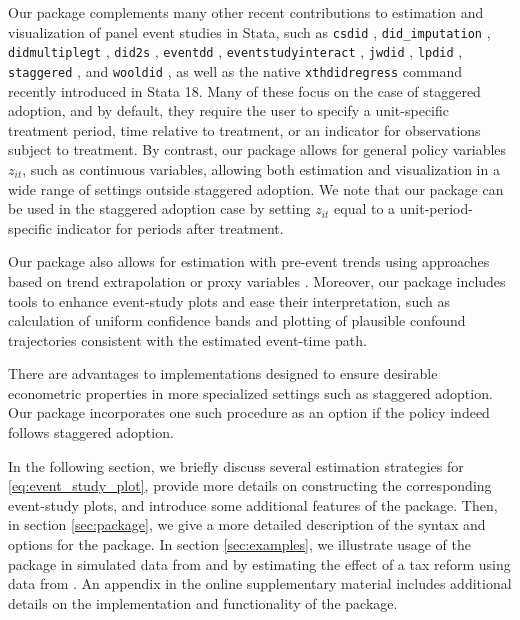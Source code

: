 \documentclass[12pt]{article}
\begin{document}
\sloppypar Our package complements many other recent contributions to estimation and visualization of panel event studies in Stata, such as \texttt{csdid} \citep{csdid}, \mbox{\texttt{did\_imputation}} \citep{didimputation}, \texttt{didmultiplegt} \citep{didmultiplegt}, \texttt{did2s} \citep{did2s}, \texttt{eventdd} \citep{eventddsj}, \mbox{\texttt{eventstudyinteract}} \citep{eventstudyinteract}, \texttt{jwdid} \citep{jwdid}, \texttt{lpdid} \citep{lpdid}, \mbox{\texttt{staggered}} \citep{staggered}, and \texttt{wooldid} \citep{wooldid}, as well as the native \mbox{\texttt{xthdidregress}} command recently introduced in Stata 18.
Many of these focus on the case of staggered adoption, and by default, they require the user to specify a unit-specific treatment period, time relative to treatment, or an indicator for observations subject to treatment.
By contrast, our package allows for general policy variables $z_{it}$, such as continuous variables, allowing both estimation and visualization in a wide range of settings outside staggered adoption.
We note that our package can be used in the staggered adoption case by setting $z_{it}$ equal to a unit-period-specific indicator for periods after treatment.

Our package also allows for estimation with pre-event trends using approaches based on trend extrapolation \citep{dobkin2018economic} or proxy variables \citep{freyaldenhoven2019pre}.
Moreover, our package includes tools to enhance event-study plots and ease their interpretation, such as calculation of uniform confidence bands and plotting of plausible confound trajectories consistent with the estimated event-time path.

There are advantages to implementations designed to ensure desirable econometric properties in more specialized settings such as staggered adoption.
Our package incorporates one such procedure as an option if the policy indeed follows staggered adoption.


In the following section, we briefly discuss several estimation strategies for \eqref{eq:event_study_plot}, provide more details on constructing the corresponding event-study plots, and introduce some additional features of the \xtevent package.
Then, in section \ref{sec:package}, we give a more detailed description of the syntax and options for the \xtevent package.
In section \ref{sec:examples}, we illustrate usage of the package in simulated data from \citet{freyaldenhoven2021visualizationforth} and by estimating the effect of a tax reform using data from \citet{martinez2022mobility}. An appendix in the online supplementary material includes additional details on the implementation and functionality of the package.
\end{document}
